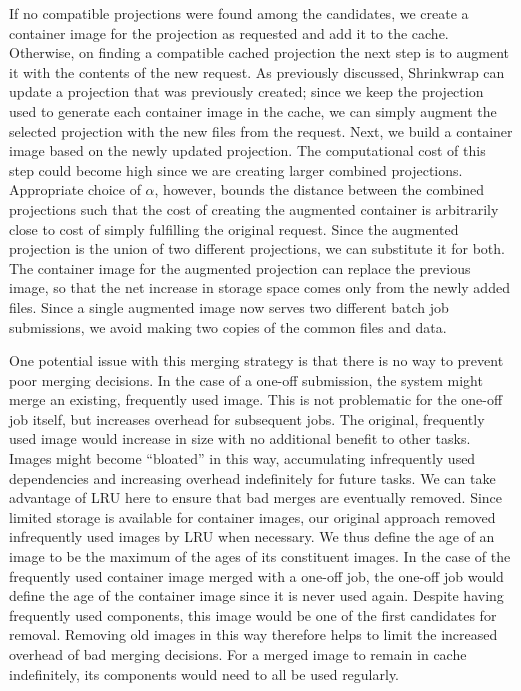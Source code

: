 \documentclass[sigconf]{acmart}
\begin{document}
If no compatible projections were found among the candidates,
we create a container image for the projection as requested and add it to the cache.
Otherwise, on finding a compatible cached projection the next step is to augment it with the contents of the new request.
As previously discussed,
Shrinkwrap can update a projection that was previously created;
since we keep the projection used to generate each container image in the cache,
we can simply augment the selected projection with the new files from the request.
Next, we build a container image based on the newly updated projection.
The computational cost of this step could become high since we are creating larger combined projections.
Appropriate choice of $\alpha$, however,
bounds the distance between the combined projections such that the cost of creating the augmented container is arbitrarily close to cost of simply fulfilling the original request.
Since the augmented projection is the union of two different projections,
we can substitute it for both.
The container image for the augmented projection can replace the previous image,
so that the net increase in storage space comes only from the newly added files.
Since a single augmented image now serves two different batch job submissions,
we avoid making two copies of the common files and data.

One potential issue with this merging strategy is that there is no way to prevent poor merging decisions.
In the case of a one-off submission,
the system might merge an existing, frequently used image.
This is not problematic for the one-off job itself,
but increases overhead for subsequent jobs.
The original, frequently used image would increase in size with no additional benefit to other tasks.
Images might become ``bloated'' in this way,
accumulating infrequently used dependencies and increasing overhead indefinitely for future tasks.
We can take advantage of LRU here to ensure that bad merges are eventually removed.
Since limited storage is available for container images,
our original approach removed infrequently used images by LRU when necessary.
We thus define the age of an image to be the maximum of the ages of its constituent images.
In the case of the frequently used container image merged with a one-off job,
the one-off job would define the age of the container image since it is never used again.
Despite having frequently used components,
this image would be one of the first candidates for removal.
Removing old images in this way therefore helps to limit the increased overhead of bad merging decisions.
For a merged image to remain in cache indefinitely,
its components would need to all be used regularly.
\end{document}
